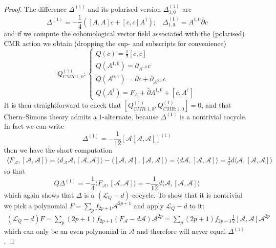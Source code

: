 \documentclass[a4paper,reqno]{amsart}
\newcommand{\LQ}{\mathcal{L}_{Q}}
\begin{document}
\begin{proof}
The difference $\Delta^{(1)}$ and its polarised version $\Delta^{(1)}_{1,0}$ are
\begin{equation}
\Delta^{(1)}= -\frac14 \left( [A,A]c + [c,c]A^\dag\right);\ \ \ \ \Delta^{(1)}_{1,0}=A^{1,0} \bar{\partial} c 
\end{equation}
and if we compute the cohomological vector field associated with the (polarised) CMR action we obtain (dropping the sup- and subscripts for convenience)
\begin{equation}
Q^{(1)}_{CMR:1,0} :\begin{cases}
Q(c) = \frac12 [c,c]\\
Q(A^{1,0}) = \partial_{A^{1,0}} c\\
Q(A^{0,1})= \bar{\partial}c + \bar{\partial}_{A^{0,1}} c\\
Q(A^\dag)= F_A + \bar{\partial}A^{1,0} + [c,A^\dag]
\end{cases}
\end{equation}
It is then straightforward to check that $[Q^{(1)}_{CMR:1,0},Q^{(1)}_{CMR:1,0}]=0$, and that Chern--Simons theory admits a $1$-alternate, because $\Delta^{(1)}$ is a nontrivial cocycle. In fact we can write
\begin{equation}
\Delta^{(1)}=- \frac{1}{12} \left[\mathcal{A}[\mathcal A, \mathcal{A}]\right]^{(1)}
\end{equation}
then we have the short computation
\begin{multline}
\langle F_{\mathcal{A}}, [\mathcal{A},\mathcal{A}] \rangle= \langle d_{\mathcal{A}}\mathcal{A}, [\mathcal{A},\mathcal{A}] \rangle - \langle[\mathcal{A},\mathcal{A}], [\mathcal{A},\mathcal{A}] \rangle=\langle d\mathcal{A}, [\mathcal{A},\mathcal{A}]\rangle = \frac13 d \langle\mathcal{A}, [\mathcal{A},\mathcal{A}]\rangle
\end{multline}
so that 
$$Q\Delta^{(1)} = -\frac14 \langle F_{\mathcal{A}},[\mathcal{A},\mathcal{A}]\rangle =-\frac{1}{12} d \langle \mathcal{A},[\mathcal{A},\mathcal{A}]\rangle$$
which again shows that $\Delta$ is a $(\LQ - d)$-cocycle. To show that it is nontrivial we pick a polynomial $F= \sum_{p}f_{2p+1}\mathcal{A}^{2p+1}$ and apply $\LQ-d$ to it:
\begin{multline}
(\LQ-d)F = \sum_p (2p+1) f_{2p+1}(F_{\mathcal{A}} - d\mathcal{A})\mathcal{A}^{2p} = \sum_p (2p+1) f_{2p+1}\frac12[\mathcal{A},\mathcal{A}]\mathcal{A}^{2p}
\end{multline}
which can only be an even polynomial in $\mathcal{A}$ and therefore will never equal $\Delta^{(1)}$.

\end{proof}
\end{document}
